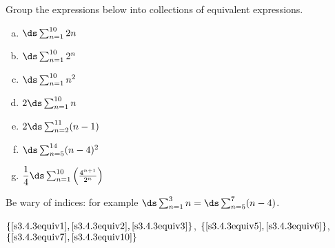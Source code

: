 \begin{Mquestion}
Group the expressions below into collections of equivalent expressions.
\begin{enumerate}[(a)]
\item\label{s3.4.3equiv1} $\ds\sum_{n=1}^{10} 2n$
\item\label{s3.4.3equiv5} $\ds\sum_{n=1}^{10} 2^n$
\item\label{s3.4.3equiv7}  $\ds\sum_{n=1}^{10} n^2$
\item\label{s3.4.3equiv2}$2\ds\sum_{n=1}^{10} n$
\item\label{s3.4.3equiv3}$2\ds\sum_{n=2}^{11} (n-1)$
\item\label{s3.4.3equiv10}  $\ds\sum_{n=5}^{14} (n-4)^2$
\item\label{s3.4.3equiv6} $\dfrac{1}{4}\ds\sum_{n=1}^{10}\left( \frac{4^{n+1}}{2^n}\right)$
\end{enumerate}
\end{Mquestion}
\begin{hint}
Be wary of indices: for example $\ds\sum_{n=1}^3 n = \ds\sum_{n=5}^7 (n-4)$.
\end{hint}
\begin{answer}
\textcolor{blue}{$\{\eqref{s3.4.3equiv1},\eqref{s3.4.3equiv2},
\eqref{s3.4.3equiv3}\}$},
\textcolor{red}{$\{\eqref{s3.4.3equiv5},\eqref{s3.4.3equiv6}\}$},
\textcolor{green}{$\{\eqref{s3.4.3equiv7},\eqref{s3.4.3equiv10}\}$}
\end{answer}
